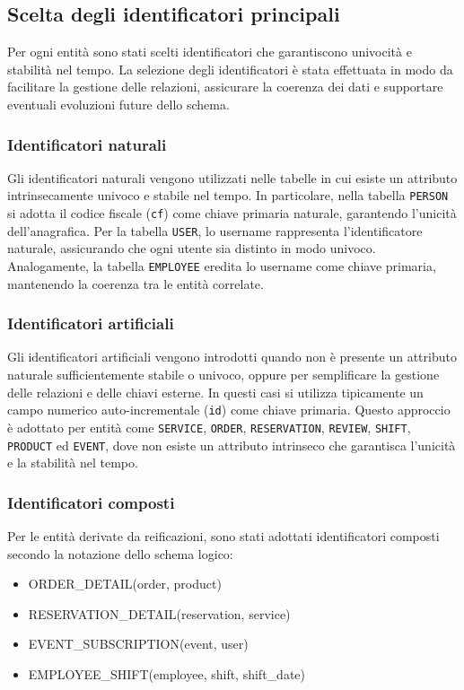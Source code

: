 \documentclass[a4paper,12pt]{report}
\begin{document}
\subsection{Scelta degli identificatori principali}
Per ogni entità sono stati scelti identificatori che garantiscono
univocità e stabilità nel tempo. La selezione degli identificatori è
stata effettuata in modo da facilitare la gestione delle relazioni,
assicurare la coerenza dei dati e supportare eventuali evoluzioni
future dello schema.

\subsubsection{Identificatori naturali}
Gli identificatori naturali vengono utilizzati nelle tabelle in cui
esiste un attributo intrinsecamente univoco e stabile nel tempo. In
particolare, nella tabella \texttt{PERSON} si adotta il codice
fiscale (\texttt{cf}) come chiave primaria naturale, garantendo
l'unicità dell'anagrafica. Per la tabella \texttt{USER}, lo username
rappresenta l'identificatore naturale, assicurando che ogni utente
sia distinto in modo univoco. Analogamente, la tabella
\texttt{EMPLOYEE} eredita lo username come chiave primaria,
mantenendo la coerenza tra le entità correlate.

\subsubsection{Identificatori artificiali}
Gli identificatori artificiali vengono introdotti quando non è
presente un attributo naturale sufficientemente stabile o univoco,
oppure per semplificare la gestione delle relazioni e delle chiavi
esterne. In questi casi si utilizza tipicamente un campo numerico
auto-incrementale (\texttt{id}) come chiave primaria. Questo
approccio è adottato per entità come \texttt{SERVICE}, \texttt{ORDER},
\texttt{RESERVATION}, \texttt{REVIEW}, \texttt{SHIFT}, \texttt{PRODUCT}
ed \texttt{EVENT}, dove non esiste un attributo intrinseco che garantisca
l'unicità e la stabilità nel tempo.

\subsubsection{Identificatori composti}
Per le entità derivate da reificazioni, sono stati adottati
identificatori composti secondo la notazione dello schema logico:

\begin{itemize}
  \item ORDER\_DETAIL(order, product)
  \item RESERVATION\_DETAIL(reservation, service)
  \item EVENT\_SUBSCRIPTION(event, user)
  \item EMPLOYEE\_SHIFT(employee, shift, shift\_date)
\end{itemize}
\end{document}
